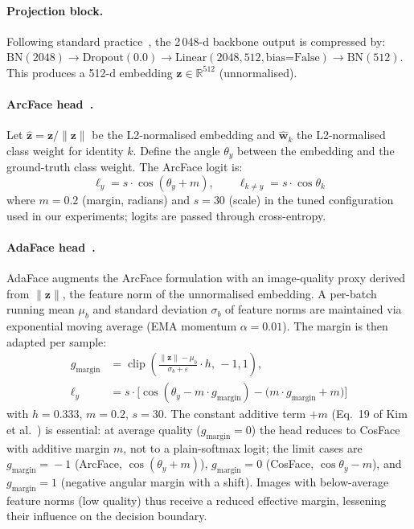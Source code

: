 \paragraph{Projection block.}
Following standard practice~\cite{deng2019arcface}, the 2\,048-d backbone output is
compressed by:
$\mathrm{BN}(2048) \!\to\! \mathrm{Dropout}(0.0) \!\to\! \mathrm{Linear}(2048, 512,
\text{bias=False}) \!\to\! \mathrm{BN}(512)$.
This produces a 512-d embedding $\mathbf{z} \in \mathbb{R}^{512}$ (unnormalised).

\paragraph{ArcFace head~\cite{deng2019arcface}.}
Let $\hat{\mathbf{z}} = \mathbf{z}/\|\mathbf{z}\|$ be the L2-normalised embedding and
$\hat{\mathbf{w}}_k$ the L2-normalised class weight for identity $k$.  Define the angle
$\theta_{y}$ between the embedding and the ground-truth class weight.  The ArcFace logit is:
\begin{equation}
  \ell_y = s \cdot \cos(\theta_y + m), \qquad \ell_{k \ne y} = s \cdot \cos \theta_k
  \label{eq:arcface}
\end{equation}
where $m = 0.2$ (margin, radians) and $s = 30$ (scale) in the tuned configuration used in
our experiments; logits are passed through cross-entropy.

\paragraph{AdaFace head~\cite{kim2022adaface}.}
AdaFace augments the ArcFace formulation with an image-quality proxy derived from
$\|\mathbf{z}\|$, the feature norm of the unnormalised embedding.
A per-batch running mean $\mu_b$ and standard deviation $\sigma_b$ of feature norms are
maintained via exponential moving average (EMA momentum $\alpha = 0.01$).
The margin is then adapted per sample:
\begin{align}
  g_{\text{margin}} &= \operatorname{clip}\!\left(\frac{\|\mathbf{z}\| - \mu_b}
                                                {\sigma_b + \varepsilon} \cdot h,\,
                                                -1, 1\right), \\
  \ell_y &= s \cdot \bigl[\cos(\theta_y - m \cdot g_{\text{margin}}) - \bigl(m \cdot
                          g_{\text{margin}} + m\bigr)\bigr]
  \label{eq:adaface}
\end{align}
with $h = 0.333$, $m = 0.2$, $s = 30$.  The constant additive term $+m$
(Eq.~19 of Kim et al.~\cite{kim2022adaface}) is essential: at average quality
($g_{\text{margin}}\!=\!0$) the head reduces to CosFace with additive margin $m$,
not to a plain-softmax logit; the limit cases are $g_{\text{margin}}\!=\!-1$
(ArcFace, $\cos(\theta_y+m)$), $g_{\text{margin}}\!=\!0$ (CosFace,
$\cos\theta_y-m$), and $g_{\text{margin}}\!=\!1$ (negative angular margin with a
shift).  Images with below-average feature norms (low quality) thus receive a
reduced effective margin, lessening their influence on the decision boundary.

